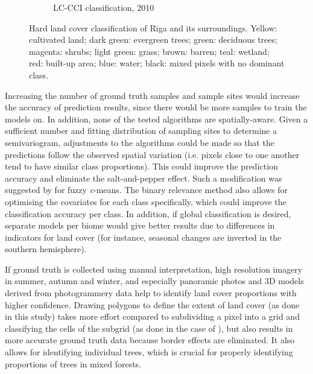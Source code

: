 \documentclass[a4paper,12pt]{scrbook}
\begin{document}
\begin{figure}
\begin{subfigure}{0.48\textwidth}
    \caption{LC-CCI classification, 2010 \citep{lccciguide}}
  \end{subfigure}
  \caption{Hard land cover classification of R\={\i}ga and its surroundings. Yellow: cultivated land; dark green: evergreen trees; green: deciduous trees; magenta: shrubs; light green: grass; brown: barren; teal: wetland; red: built-up area; blue: water; black: mixed pixels with no dominant class.}
  \label{fig-hard-rf}
\end{figure}

Increasing the number of ground truth samples and sample sites would increase the accuracy of prediction results, since there would be more samples to train the models on. In addition, none of the tested algorithms are spatially-aware. Given a sufficient number and fitting distribution of sampling sites to determine a semivariogram, adjustments to the algorithms could be made so that the predictions follow the observed spatial variation (i.e. pixels close to one another tend to have similar class proportions). This could improve the prediction accuracy and eliminate the salt-and-pepper effect. Such a modification was suggested by \citet{gong2013improvedcmeans} for fuzzy \textit{c}-means. The binary relevance method also allows for optimising the covariates for each class specifically, which could improve the classification accuracy per class. In addition, if global classification is desired, separate models per biome would give better results due to differences in indicators for land cover (for instance, seasonal changes are inverted in the southern hemisphere).

If ground truth is collected using manual interpretation, high resolution imagery in summer, autumn and winter, and especially panoramic photos and 3D models derived from photogrammery data help to identify land cover proportions with higher confidence. Drawing polygons to define the extent of land cover (as done in this study) takes more effort compared to subdividing a pixel into a grid and classifying the cells of the subgrid (as done in the case of \citet{perger2012geowiki}), but also results in more accurate ground truth data because border effects are eliminated. It also allows for identifying individual trees, which is crucial for properly identifying proportions of trees in mixed forests.
\end{document}

